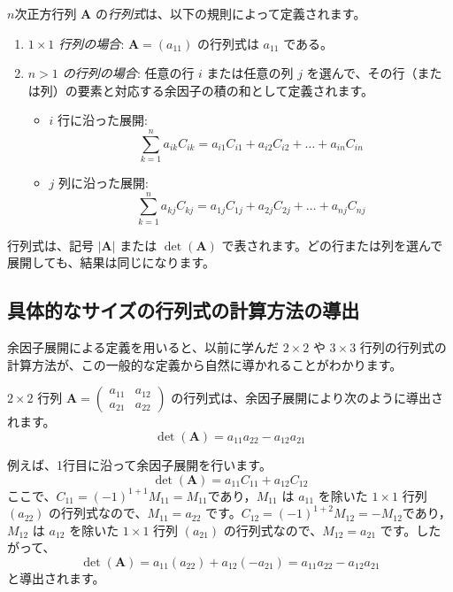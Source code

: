 \begin{dfn} \label{determinant}
$n$次正方行列 $\bm{A}$ の\emph{行列式}は、以下の規則によって定義されます。
\begin{enumerate}
    \item \emph{$1 \times 1$ 行列の場合}: $\bm{A} = (a_{11})$ の行列式は $a_{11}$ である。
    \item \emph{$n > 1$ の行列の場合}: 任意の行 $i$ または任意の列 $j$ を選んで、その行（または列）の要素と対応する余因子の積の和として定義されます。
    \begin{itemize}
        \item $i$ 行に沿った展開:
        \[ \sum_{k=1}^{n} a_{ik}C_{ik} = a_{i1}C_{i1} + a_{i2}C_{i2} + \dots + a_{in}C_{in} \]
        \item $j$ 列に沿った展開:
        \[ \sum_{k=1}^{n} a_{kj}C_{kj} = a_{1j}C_{1j} + a_{2j}C_{2j} + \dots + a_{nj}C_{nj} \]
    \end{itemize}
\end{enumerate}
行列式は、記号 $|\bm{A}|$ または $\det(\bm{A})$ で表されます。どの行または列を選んで展開しても、結果は同じになります。
\end{dfn}

\subsection{具体的なサイズの行列式の計算方法の導出}

余因子展開による定義を用いると、以前に学んだ $2 \times 2$ や $3 \times 3$ 行列の行列式の計算方法が、この一般的な定義から自然に導かれることがわかります。

\begin{thm} \label{determinant2}
$2 \times 2$ 行列 $\bm{A} = \begin{pmatrix} a_{11} & a_{12} \\ a_{21} & a_{22} \end{pmatrix}$ の行列式は、余因子展開により次のように導出されます。
\[ \det(\bm{A}) = a_{11}a_{22} - a_{12}a_{21} \]
\begin{proof*}
例えば、1行目に沿って余因子展開を行います。
\[ \det(\bm{A}) = a_{11}C_{11} + a_{12}C_{12} \]
ここで、$C_{11} = (-1)^{1+1}M_{11} = M_{11}$であり，$M_{11}$ は $a_{11}$ を除いた $1 \times 1$ 行列 $(a_{22})$ の行列式なので、$M_{11} = a_{22}$ です。$C_{12} = (-1)^{1+2}M_{12} = -M_{12}$であり，$M_{12}$ は $a_{12}$ を除いた $1 \times 1$ 行列 $(a_{21})$ の行列式なので、$M_{12} = a_{21}$ です。したがって、
\[ \det(\bm{A}) = a_{11}(a_{22}) + a_{12}(-a_{21}) = a_{11}a_{22} - a_{12}a_{21} \]
と導出されます。
\end{proof*}
\end{thm}


